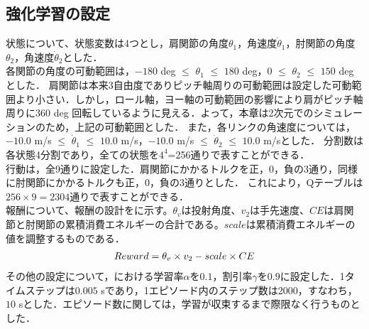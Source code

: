 \begin{small}
\subsection{強化学習の設定}
状態について、状態変数は4つとし，肩関節の角度$\theta_{1}$，角速度$\dot{\theta}_{1}$，肘関節の角度$\theta_{2}$，角速度$\dot{\theta}_{2}$とした．\\
各関節の角度の可動範囲は，$-180$ deg $\le$ $\theta_{1}$ $\le$ $180$ deg，$0$ $\le$ $\theta_{2}$ $\le$ $150$ deg\cite{range}とした．
肩関節は本来3自由度でありピッチ軸周りの可動範囲は設定した可動範囲より小さい．しかし，ロール軸，ヨー軸の可動範囲の影響により肩がピッチ軸周りに$360$ deg 回転しているように見える．よって，本章は2次元でのシミュレーションのため，上記の可動範囲とした．
また，各リンクの角速度については，$-10.0$ m/s $\le$ $\dot{\theta}_{1}$ $\le$ $10.0$ m/s，$-10.0$ m/s $\le$ $\dot{\theta}_{2}$ $\le$ $10.0$ m/sとした．
分割数は各状態4分割であり，全ての状態を$4^{4}$=256通りで表すことができる．\\
行動は，全9通りに設定した．肩関節にかかるトルクを正，0，負の3通り，同様に肘関節にかかるトルクも正，0，負の3通りとした．
これにより，Qテーブルは$256 \times 9=2304$通りで表すことができる．\\
報酬について、報酬の設計をに示す。$\theta_{v}$は投射角度、$v_{2}$は手先速度、$CE$は肩関節と肘関節の累積消費エネルギーの合計である。$scale$は累積消費エネルギーの値を調整するものである．
\begin{eqnarray}
  \equlabel{9}
  Reward = \theta_{v} \times v_{2} - scale \times CE
\end{eqnarray}
その他の設定について，における学習率$\alpha$を$0.1$，割引率$\gamma$を$0.9$に設定した．1タイムステップは$0.005$ sであり，1エピソード内のステップ数は2000，すなわち，$10$ sとした．エピソード数に関しては，学習が収束するまで際限なく行うものとした．


\end{small}
